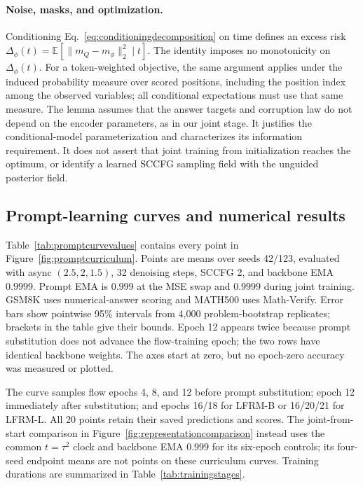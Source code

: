 \documentclass{article}
\newcommand{\E}{\mathbb{E}}
\begin{document}
\paragraph{Noise, masks, and optimization.}
Conditioning Eq.~\eqref{eq:conditioningdecomposition} on time defines an excess risk $\Delta_\phi(t)=\E[\|m_Q-m_\phi\|_2^2\mid t]$. The identity imposes no monotonicity on $\Delta_\phi(t)$. For a token-weighted objective, the same argument applies under the induced probability measure over scored positions, including the position index among the observed variables; all conditional expectations must use that same measure. The lemma assumes that the answer targets and corruption law do not depend on the encoder parameters, as in our joint stage. It justifies the conditional-model parameterization and characterizes its information requirement. It does not assert that joint training from initialization reaches the optimum, or identify a learned SCCFG sampling field with the unguided posterior field.

\subsection{Prompt-learning curves and numerical results}
\label{app:promptcurves}
Table~\ref{tab:promptcurvevalues} contains every point in Figure~\ref{fig:promptcurriculum}. Points are means over seeds 42/123, evaluated with async $(2.5,2,1.5)$, 32 denoising steps, SCCFG 2, and backbone EMA $0.9999$. Prompt EMA is $0.999$ at the MSE swap and $0.9999$ during joint training. GSM8K uses numerical-answer scoring and MATH500 uses Math-Verify. Error bars show pointwise 95\% intervals from 4,000 problem-bootstrap replicates; brackets in the table give their bounds. Epoch 12 appears twice because prompt substitution does not advance the flow-training epoch; the two rows have identical backbone weights. The axes start at zero, but no epoch-zero accuracy was measured or plotted.

The curve samples flow epochs 4, 8, and 12 before prompt substitution; epoch 12 immediately after substitution; and epochs 16/18 for LFRM-B or 16/20/21 for LFRM-L. All 20 points retain their saved predictions and scores. The joint-from-start comparison in Figure~\ref{fig:representationcomparison} instead uses the common $t=\tau^2$ clock and backbone EMA $0.999$ for its six-epoch controls; its four-seed endpoint means are not points on these curriculum curves. Training durations are summarized in Table~\ref{tab:trainingstages}.
\end{document}
